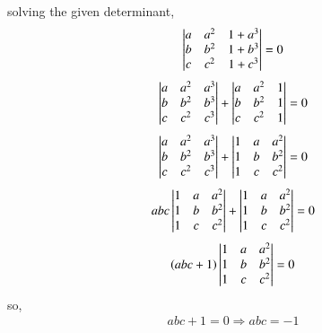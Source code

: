 \documentclass[journal,12pt,onecolumn]{IEEEtran}
\begin{document}
solving the given determinant,
\begin{align}
\begin{vmatrix}a &a^2 &1+ a^3\\ b & b^2 & 1 + b^3\\c & c^2 & 1 + c^3\end{vmatrix} = 0
\end{align}
\begin{align}
\begin{vmatrix}a &a^2 & a^3\\ b & b^2 & b^3\\c & c^2 & c^3\end{vmatrix} + \begin{vmatrix}a &a^2 & 1\\ b & b^2 & 1\\c & c^2 & 1\end{vmatrix} = 0
\end{align}
\begin{align}
		\begin{vmatrix}a &a^2 & a^3\\ b & b^2 & b^3\\c & c^2 & c^3\end{vmatrix} + \begin{vmatrix}1&a &a^2 \\1& b & b^2 \\1& c & c^2\end{vmatrix} = 0
\end{align}
\begin{align}
		 abc\begin{vmatrix}1&a &a^2 \\1& b & b^2 \\1& c & c^2\end{vmatrix}  + \begin{vmatrix}1&a &a^2 \\1& b & b^2 \\1& c & c^2\end{vmatrix} = 0
\end{align}
\begin{align}
		\left(abc+1\right)\begin{vmatrix}1&a &a^2 \\1& b & b^2 \\1& c & c^2\end{vmatrix}	= 0
\end{align}
so,
\begin{align}
abc+1 = 0\Rightarrow
abc = -1
\end{align}
\end{document}
